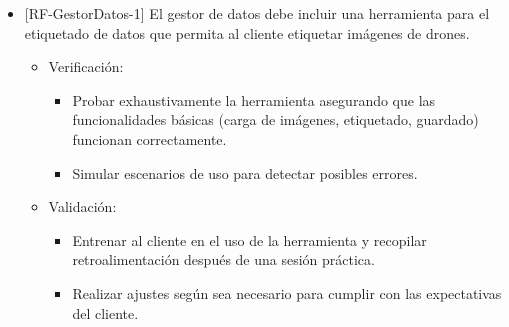 \documentclass[
11pt, %
]{charter}
\begin{document}
\begin{itemize}[label={}]
  \item {[}RF-GestorDatos-1{]} El gestor de datos debe incluir una herramienta para el etiquetado de datos que permita al cliente etiquetar imágenes de drones.
        \begin{itemize}
          \item Verificación:
                \begin{itemize}
                  \item Probar exhaustivamente la herramienta asegurando que las funcionalidades básicas (carga de imágenes, etiquetado, guardado) funcionan correctamente.
                  \item Simular escenarios de uso para detectar posibles errores.
                \end{itemize}
          \item Validación:
                \begin{itemize}
                  \item Entrenar al cliente en el uso de la herramienta y recopilar retroalimentación después de una sesión práctica.
                  \item Realizar ajustes según sea necesario para cumplir con las expectativas del cliente.
                \end{itemize}
        \end{itemize}


\end{itemize}
\end{document}
